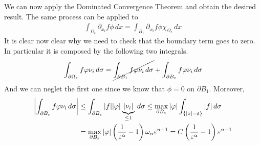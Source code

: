 We can now apply the Dominated Convergence Theorem and obtain the desired result. 
The same process can be applied to
\[
    \begin{split}
        \int_{\Omega_\epsilon} \partial_{x_i} f \phi \, dx = \int_{B_1} \partial_{x_i} f \phi \chi_{\Omega_\epsilon} \, dx
    \end{split}
\]
It is clear now clear why we need to check that the boundary term goes to zero. In particular it is composed by the following two integrals.
\[
    \begin{split}
        \int_{\partial\Omega_\epsilon} f \phi \nu_i \, d\sigma = \cancel{\int_{\partial B_1} f \phi \nu_i \, d\sigma} + \int_{\partial B_\epsilon} f \phi \nu_i \, d\sigma
    \end{split}
\]
And we can neglet the first one since we know that $\phi = 0$ on $\partial B_1$.
Moreover,
\begin{equation}\label{eq:boundary_term}
    \begin{split}
    \abs{\int_{\partial B_\epsilon} f \phi \nu_i \, d\sigma} & \leq \int_{\partial B_\epsilon} \abs{f} \abs{\phi} \underbrace{\abs{\nu_i}}_{\leq 1} \, d\sigma \leq \max_{\partial B_\epsilon} \abs{\phi} \int_{\{ \abs{x} = \epsilon \}} \abs{f} \, d\sigma \\
                                                                 & = \max_{\partial B_\epsilon} \abs{\phi} \left(\frac{1}{\epsilon^\alpha}-1\right) \omega_n \epsilon^{n-1} = C \left(\frac{1}{\epsilon^\alpha}-1\right) \epsilon^{n-1}
    \end{split}
\end{equation}


